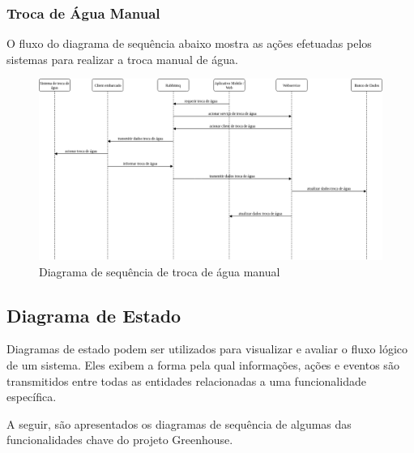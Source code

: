 \subsubsection{Troca de Água Manual}

O fluxo do diagrama de sequência abaixo mostra as ações efetuadas pelos sistemas para realizar a troca manual de água.

\begin{figure}[H]
	\centering
	\includegraphics[width=18cm]{figuras/troca_agua_manual.png}
	\caption{Diagrama de sequência de troca de água manual} \label{troca_agua_manual}
\end{figure}

\subsection{Diagrama de Estado}

Diagramas de estado podem ser utilizados para visualizar e avaliar o fluxo lógico de um sistema. Eles exibem a forma pela qual informações, ações e eventos são transmitidos entre todas as entidades relacionadas a uma funcionalidade específica.

A seguir, são apresentados os diagramas de sequência de algumas das funcionalidades chave do projeto Greenhouse.
